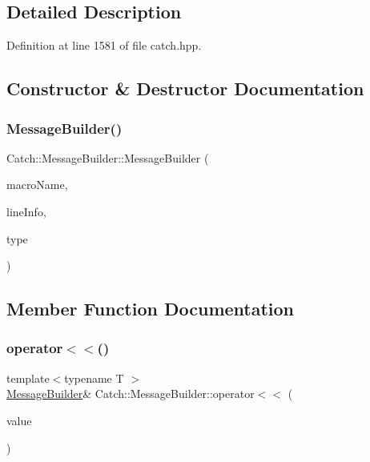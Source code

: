 \subsection{Detailed Description}


Definition at line 1581 of file catch.\+hpp.



\subsection{Constructor \& Destructor Documentation}
\mbox{\label{struct_catch_1_1_message_builder_ab0c6378e722680bf58852c6ee2b6e724}} 
\subsubsection{\texorpdfstring{Message\+Builder()}{MessageBuilder()}}
{\footnotesize\ttfamily Catch\+::\+Message\+Builder\+::\+Message\+Builder (\begin{DoxyParamCaption}\item[{std\+::string const \&}]{macro\+Name,  }\item[{\mbox{\hyperlink{struct_catch_1_1_source_line_info}{Source\+Line\+Info}} const \&}]{line\+Info,  }\item[{\mbox{\hyperlink{struct_catch_1_1_result_was_a624e1ee3661fcf6094ceef1f654601ef}{Result\+Was\+::\+Of\+Type}}}]{type }\end{DoxyParamCaption})}



\subsection{Member Function Documentation}
\mbox{\label{struct_catch_1_1_message_builder_a20fa48d069b20dddcc2d3df8abb123c1}} 
\subsubsection{\texorpdfstring{operator$<$$<$()}{operator<<()}}
{\footnotesize\ttfamily template$<$typename T $>$ \\
\mbox{\hyperlink{struct_catch_1_1_message_builder}{Message\+Builder}}\& Catch\+::\+Message\+Builder\+::operator$<$$<$ (\begin{DoxyParamCaption}\item[{T const \&}]{value }\end{DoxyParamCaption})\hspace{0.3cm}{\ttfamily [inline]}}




